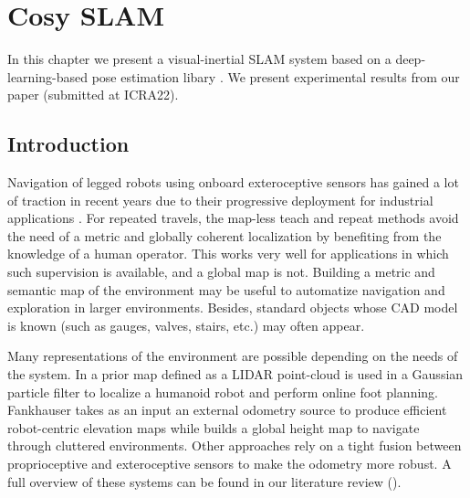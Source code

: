 \chapter{Cosy SLAM}
\label{chp:cosyslam}
\minitoc
\bigskip


In this chapter we present a visual-inertial SLAM system based on a deep-learning-based pose estimation libary \cite{labbe2020cosypose}.
We present experimental results from our paper \cite{debeunne2021cosyslam} (submitted at ICRA22).

\section{Introduction}
Navigation of legged robots using onboard exteroceptive sensors has gained a lot of traction in recent years due to their progressive deployment for 
industrial applications \cite{bellicoso2018advances}. 
For repeated travels, the map-less teach and repeat methods \cite{furgale2010visual, mattamala2021learning} avoid the need of a metric and globally coherent localization 
by benefiting from the knowledge of a human operator. This works very well for applications in which such supervision is available, and a global map is not. 
Building a metric and semantic map of the environment may be useful to automatize navigation and exploration in larger environments. Besides,
standard objects whose CAD model is known (such as gauges, valves, stairs, etc.) may often appear.

Many representations of the environment are possible depending on the needs of the system. In \cite{fallon2014drift} a prior map defined as a LIDAR point-cloud is 
used in a Gaussian particle filter to localize a humanoid robot and perform online foot planning. Fankhauser \cite{fankhauser2014robot} takes as an input 
an external odometry source to produce efficient robot-centric elevation maps while \cite{kim2020vision} builds a global height map to navigate through cluttered 
environments. Other approaches \cite{wisth2021vilens} rely on a tight fusion between proprioceptive and exteroceptive sensors to make the odometry more robust. 
A full overview of these systems can be found in our literature review ().

